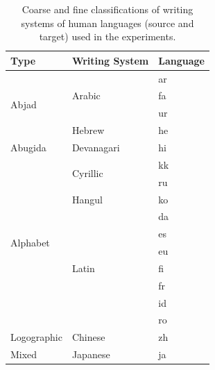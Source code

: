 \begin{table}
  \centering
  \begin{tabular}{lll}
    \toprule
    Type & Writing System & Language \\
    \midrule
    \multirow{4}{*}{Abjad} & \multirow{3}{*}{Arabic} & ar \\
            & & fa \\
            & & ur \\
        \cmidrule{2-3}
        & Hebrew & he \\
        \midrule
    Abugida & Devanagari & hi \\
    \midrule
    \multirow{10}{*}{Alphabet} & \multirow{2}{*}{Cyrillic} & kk \\
            & & ru \\
        \cmidrule{2-3}
        & Hangul & ko \\
        \cmidrule{2-3}
        & \multirow{7}{*}{Latin} & da \\
            & & es \\
            & & eu \\
            & & fi \\
            & & fr \\
            & & id \\
            & & ro \\
    \midrule
    Logographic & Chinese & zh \\
    \midrule
    Mixed & Japanese & ja \\
    \bottomrule
  \end{tabular}
  \caption{%
    Coarse and fine classifications of writing systems of human languages (source and target) used in the experiments.
  }
  \unskip\label{tab:writing-system}
\end{table}


\begin{table}
  \centering
  \caption{%
    Normalized XferBench scores by writing system (lower is better).
    Color is normalized across all values.
  }
  \unskip\label{tab:clm-writing-system}
\end{table}

\begin{table}
  \centering
  \caption{%
    Normalized XferBench scores by writing system type (lower is better).
    Color is normalized across all values.
  }
  \unskip\label{tab:clm-writing-system-type}
\end{table}

